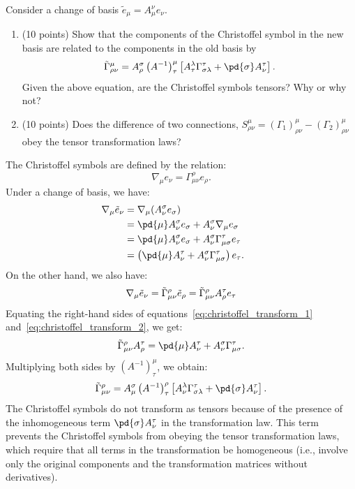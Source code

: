 \begin{problem}
  Consider a change of basis $\tilde{e}_\mu = A_\mu^\nu e_\nu$.
  \begin{enumerate}
    \item (10 points) Show that the components of the Christoffel symbol in the new basis are related to the components in the old basis by
      \[%
        \G_{\rho\nu}^\mu = A_\rho^\sigma \left(A^{-1}\right)_\tau^\mu \left[A_\tau^\lambda \Gamma_{\sigma\lambda}^\tau + \pd{\sigma}A_\nu^\tau\right]
      .\]%
      Given the above equation, are the Christoffel symbols tensors? Why or why not?

    \item (10 points) Does the difference of two connections, $S_{\rho\nu}^\mu = (\Gamma_1)_{\rho\nu}^\mu - (\Gamma_2)_{\rho\nu}^\mu$ obey the tensor transformation laws?
  \end{enumerate}
\end{problem}

\begin{solution}[(i)]
  The Christoffel symbols are defined by the relation:
  \[%
    \nabla_\mu e_\nu = \Gamma_{\mu\nu}^\rho e_\rho
  .\]%
  Under a change of basis, we have:
  \begin{align}
    \nabla_\mu \tilde{e}_\nu &= \nabla_\mu (A_\nu^\sigma e_\sigma) \tag*{} \\
                             &= \pd{\mu} A_\nu^\sigma e_\sigma + A_\nu^\sigma \nabla_\mu e_\sigma \tag*{} \\
                             &= \pd{\mu} A_\nu^\sigma e_\sigma + A_\nu^\sigma \Gamma_{\mu\sigma}^\tau e_\tau \tag*{} \\
                             &= \left(\pd{\mu} A_\nu^\tau + A_\nu^\sigma \Gamma_{\mu\sigma}^\tau\right) e_\tau \label{eq:christoffel_transform_1}
  .\end{align}
  On the other hand, we also have:
  \begin{equation}\label{eq:christoffel_transform_2}
    \nabla_\mu \tilde{e}_\nu = \tilde{\Gamma}_{\mu\nu}^\rho \tilde{e}_\rho = \tilde{\Gamma}_{\mu\nu}^\rho A_\rho^\tau e_\tau
  \end{equation}
  Equating the right-hand sides of equations~\eqref{eq:christoffel_transform_1} and~\eqref{eq:christoffel_transform_2}, we get:
  \[%
    \G_{\mu\nu}^\rho A_\rho^\tau = \pd{\mu} A_\nu^\tau + A_\nu^\sigma \Gamma_{\mu\sigma}^\tau
  .\]%
  Multiplying both sides by $\left(A^{-1}\right)_\tau^\mu$, we obtain:
  \[%
    \G_{\mu\nu}^\rho = A_\mu^\sigma \left(A^{-1}\right)_\tau^\rho \left[A_\nu^\lambda \Gamma_{\sigma\lambda}^\tau + \pd{\sigma}A_\nu^\tau\right]
  .\]%
  The Christoffel symbols do not transform as tensors because of the presence of the inhomogeneous term $\pd{\sigma}A_\nu^\tau$ in the transformation law. This term prevents the Christoffel symbols from obeying the tensor transformation laws, which require that all terms in the transformation be homogeneous (i.e., involve only the original components and the transformation matrices without derivatives).
\end{solution}

